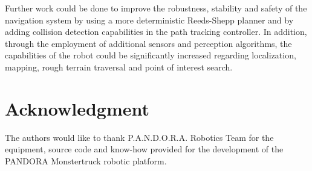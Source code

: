\documentclass[conference]{IEEEtran}
\begin{document}
Further work could be done to improve the robustness, stability and safety of the navigation system by using a more deterministic Reeds-Shepp planner and by adding collision detection capabilities in the path tracking controller. In addition, through the employment of additional sensors and perception algorithms, the capabilities of the robot could be significantly increased regarding localization, mapping, rough terrain traversal and point of interest search.

\section*{Acknowledgment}
The authors would like to thank P.A.N.D.O.R.A. Robotics Team for the equipment, source code and know-how provided for the development of the PANDORA Monstertruck robotic platform.




\end{document}
